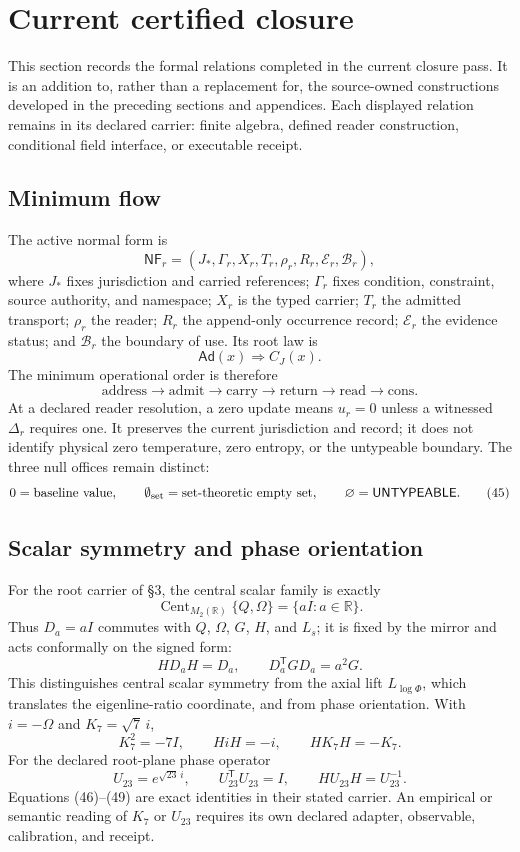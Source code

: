 \section{Current certified closure}

\noindent This section records the formal relations completed in the current
closure pass.  It is an addition to, rather than a replacement for, the
source-owned constructions developed in the preceding sections and appendices.
Each displayed relation remains in its declared carrier: finite algebra,
defined reader construction, conditional field interface, or executable
receipt.

\subsection{Minimum flow}

The active normal form is
\[
\mathsf{NF}_r=
(J_*,\Gamma_r,X_r,T_r,\rho_r,R_r,\mathcal E_r,\mathcal B_r),
\tag{42}
\]
where $J_*$ fixes jurisdiction and carried references; $\Gamma_r$ fixes
condition, constraint, source authority, and namespace; $X_r$ is the typed
carrier; $T_r$ the admitted transport; $\rho_r$ the reader; $R_r$ the
append-only occurrence record; $\mathcal E_r$ the evidence status; and
$\mathcal B_r$ the boundary of use.  Its root law is
\[
\mathsf{Ad}(x)\Longrightarrow C_J(x).
\tag{43}
\]
The minimum operational order is therefore
\[
\text{address}\to\text{admit}\to\text{carry}\to\text{return}
\to\text{read}\to\text{cons}.
\tag{44}
\]
At a declared reader resolution, a zero update means $u_r=0$ unless a
witnessed $\Delta_r$ requires one.  It preserves the current jurisdiction
and record; it does not identify physical zero temperature, zero entropy, or
the untypeable boundary.  The three null offices remain distinct:
\[
0=\text{baseline value},\qquad
\emptyset_{\rm set}=\text{set-theoretic empty set},\qquad
\varnothing=\mathsf{UNTYPEABLE}.
\tag{45}
\]

\subsection{Scalar symmetry and phase orientation}

For the root carrier of \S3, the central scalar family is exactly
\[
\operatorname{Cent}_{M_2(\mathbb R)}\{Q,\Omega\}
=\{aI:a\in\mathbb R\}.
\tag{46}
\]
Thus $D_a=aI$ commutes with $Q$, $\Omega$, $G$, $H$, and $L_s$; it is fixed by
the mirror and acts conformally on the signed form:
\[
HD_aH=D_a,\qquad D_a^{\mathsf T}GD_a=a^2G.
\tag{47}
\]
This distinguishes central scalar symmetry from the axial lift
$L_{\log\Phi}$, which translates the eigenline-ratio coordinate, and from
phase orientation.  With $i=-\Omega$ and $K_7=\sqrt7\,i$,
\[
K_7^2=-7I,\qquad HiH=-i,\qquad HK_7H=-K_7.
\tag{48}
\]
For the declared root-plane phase operator
\[
U_{23}=e^{\sqrt{23}\,i},
\qquad U_{23}^{\mathsf T}U_{23}=I,
\qquad HU_{23}H=U_{23}^{-1}.
\tag{49}
\]
Equations (46)--(49) are exact identities in their stated carrier.  An
empirical or semantic reading of $K_7$ or $U_{23}$ requires its own declared
adapter, observable, calibration, and receipt.

